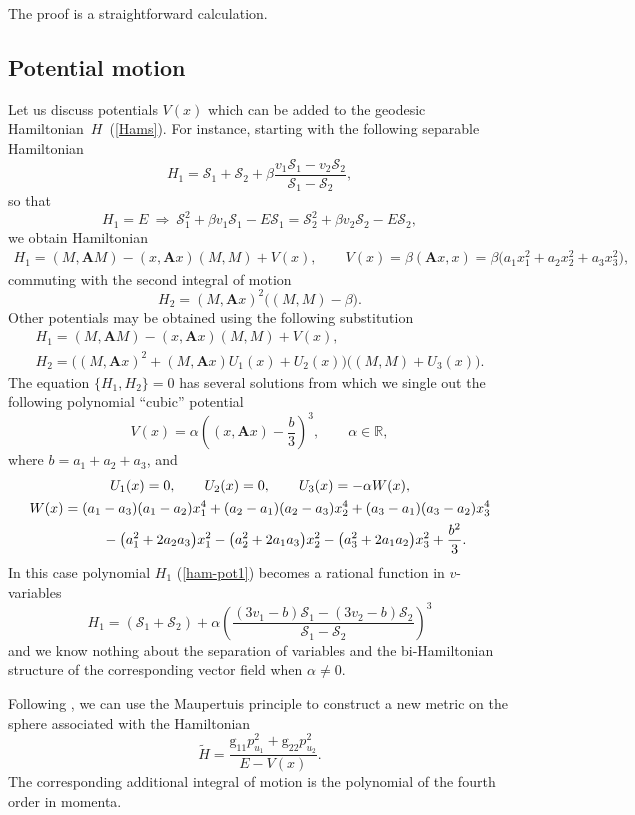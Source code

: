 \documentclass[pdftex]{sigma}
\numberwithin{equation}{section}
\begin{document}
The proof is a straightforward calculation.

\subsection{Potential motion}
Let us discuss potentials $V(x)$ which can be added to the geodesic Hamiltonian~$H$~(\ref{Hams}).
For instance, starting with the following separable Hamiltonian
\[
 H_1=\mathcal{S}_1+\mathcal{S}_2+\beta \frac{v_1\mathcal{S}_1-v_2\mathcal{S}_2}{\mathcal{S}_1-\mathcal{S}_2},
\]
so that
\[
H_1=E\ \Rightarrow\ \mathcal{S}_1^2+\beta v_1\mathcal{S}_1-E\mathcal{S}_1=\mathcal{S}_2^2+\beta v_2\mathcal{S}_2-E\mathcal{S}_2 ,
\]
we obtain Hamiltonian
\begin{gather*}
H_1=(M,\mathbf AM)-(x,\mathbf Ax)(M,M)+V(x) ,\qquad\!
V(x)=\beta(\mathbf A x,x)=\beta \big(a_1x_1^2+a_2x_2^2+a_3x_3^2\big) ,
\end{gather*}
commuting with the second integral of motion
\[
H_2= (M,\mathbf Ax)^2\bigl((M,M)-\beta\bigr).
\]
Other potentials may be obtained using the following substitution
\begin{gather}
H_1=(M,\mathbf AM)-(x,\mathbf Ax)(M,M)+V(x) ,\nonumber\\
H_2=\bigl( (M,\mathbf Ax)^2+(M,\mathbf Ax) U_1(x)+U_2(x)\bigr)\bigl((M,M)+U_3(x)\bigr) .\label{ham-pot1}
\end{gather}
The equation $\{H_1, H_2\}=0$ has several solutions from which we single out the following polynomial ``cubic'' potential
\[
V(x)=\alpha\left((x,\mathbf Ax) - \dfrac{b}{3}\right)^3 ,\qquad \alpha\in\mathbb R ,
\]
where $b=a_1+a_2+a_3$, and
\begin{gather*}
U_1(x)=0 ,\qquad U_2(x)=0 ,\qquad U_3(x)=-\alpha W(x) ,
\\
W(x)=(a_1 - a_3)(a_1 - a_2)x_1^4+(a_2-a_1)(a_2-a_3)x_2^4+(a_3-a_1)(a_3-a_2)x_3^4\\
\hphantom{W(x)=}{}
-\big(a_1^2 + 2a_2a_3\big)x_1^2-\big(a_2^2+2a_1a_3\big)x_2^2-\big(a_3^2+2a_1a_2\big)x_3^2+\dfrac{b^2}{3} .
\end{gather*}
In this case polynomial $H_1$ (\ref{ham-pot1}) becomes a rational function in $v$-variables
\[
H_1=(\mathcal{S}_1+\mathcal{S}_2)+\alpha\left(\frac{(3v_1-b)\mathcal{S}_1-(3v_2-b)\mathcal{S}_2}{\mathcal{S}_1-\mathcal{S}_2}\right)^3
\]
and we know nothing about the separation of variables and the bi-Hamiltonian structure of the corresponding vector field when $\alpha\neq 0 $.

Following \cite{bol95, ts99,ts01}, we can use the Maupertuis principle to construct a new metric on the sphere associated with the Hamiltonian
\[
\widetilde{H}=\frac{\mathrm g_{11}p^2_{u_1}+\mathrm g_{22}p^2_{u_2}}{E-V(x)} .
\]
The corresponding additional integral of motion is the polynomial of the fourth order in momenta.
\end{document}
